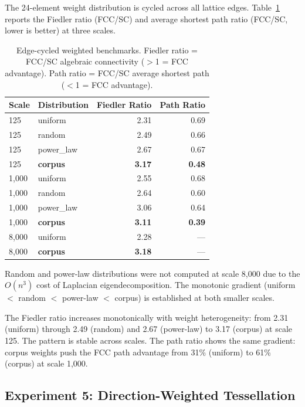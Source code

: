 \documentclass[11pt]{article}
\begin{document}
The 24-element weight distribution is cycled across all lattice edges.
Table~\ref{tab:exp1} reports the Fiedler ratio (FCC/SC) and average
shortest path ratio (FCC/SC, lower is better) at three scales.

\begin{table}[H]
\centering
\caption{Edge-cycled weighted benchmarks. Fiedler ratio = FCC/SC
  algebraic connectivity ($>$1 = FCC advantage). Path ratio = FCC/SC
  average shortest path ($<$1 = FCC advantage).}
\label{tab:exp1}
\begin{tabular}{llrr}
\toprule
Scale & Distribution & Fiedler Ratio & Path Ratio \\
\midrule
125  & uniform   & 2.31 & 0.69 \\
125  & random    & 2.49 & 0.66 \\
125  & power\_law & 2.67 & 0.67 \\
125  & \textbf{corpus} & \textbf{3.17} & \textbf{0.48} \\
\midrule
1{,}000  & uniform   & 2.55 & 0.68 \\
1{,}000  & random    & 2.64 & 0.60 \\
1{,}000  & power\_law & 3.06 & 0.64 \\
1{,}000  & \textbf{corpus} & \textbf{3.11} & \textbf{0.39} \\
\midrule
8{,}000  & uniform   & 2.28 & --- \\
8{,}000  & \textbf{corpus} & \textbf{3.18} & --- \\
\bottomrule
\end{tabular}
\smallskip

\noindent\footnotesize{Random and power-law distributions were not computed
at scale 8{,}000 due to the $O(n^3)$ cost of Laplacian eigendecomposition.
The monotonic gradient (uniform $<$ random $<$ power-law $<$ corpus) is
established at both smaller scales.}
\end{table}

The Fiedler ratio increases monotonically with weight heterogeneity:
from 2.31 (uniform) through 2.49 (random) and 2.67 (power-law) to
3.17 (corpus) at scale 125. The pattern is stable across scales.
The path ratio shows the same gradient: corpus weights push the FCC
path advantage from 31\% (uniform) to 61\% (corpus) at scale 1{,}000.

\subsection{Experiment 5: Direction-Weighted Tessellation}
\end{document}
